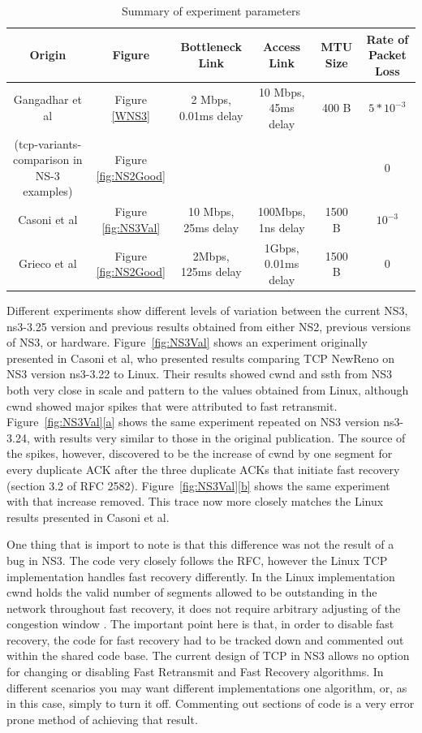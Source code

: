 \documentclass[conference]{IEEEtran}
\begin{document}
\begin{table}[!t]
\renewcommand{\arraystretch}{1.3}
\caption{Summary of experiment parameters} 
\label{table:exps}
\centering
\begin{tabular}{|c||c||c||c||c||c|}
\hline
\textbf{Origin} & \textbf{Figure} & \textbf{Bottleneck Link} & \textbf{Access Link} & \textbf{MTU Size} & \textbf{Rate of Packet Loss}\\ 
\hline
Gangadhar et al\cite{NS3W} & Figure \ref{WNS3} & 2 Mbps, 0.01ms delay & 10 Mbps, 45ms delay & 400 B & $5*10^{-3}$\\
(tcp-variants-comparison in NS-3 examples) & Figure \ref{fig:NS2Good} &  &  &  & 0 \\
\hline
Casoni et al\cite{NS3Val} & Figure \ref{fig:NS3Val} & 10 Mbps, 25ms delay & 100Mbps, 1ns delay & 1500 B & $10^{-3}$\\
\hline
Grieco et al\cite{NS2WP} & Figure \ref{fig:NS2Good} & 2Mbps, 125ms delay & 1Gbps, 0.01ms delay & 1500 B & 0 \\
\hline
\end{tabular}
\end{table}

Different experiments show different levels of variation between the current NS3, ns3-3.25 version and previous results obtained from either NS2, previous versions of NS3, or hardware. Figure~\ref{fig:NS3Val} shows an experiment originally presented in Casoni et al\cite{NS3Val}, who presented results comparing TCP NewReno on NS3 version ns3-3.22 to Linux. Their results showed cwnd and ssth from NS3 both very close in scale and pattern to the values obtained from Linux, although cwnd showed major spikes that were attributed to fast retransmit. Figure~\ref{fig:NS3Val}\ref{a} shows the same experiment repeated on NS3 version ns3-3.24, with results very similar to those in the original publication. The source of the spikes, however, discovered to be the increase of cwnd by one segment for every duplicate ACK after the three duplicate ACKs that initiate fast recovery (section 3.2 of RFC 2582\cite{RFC2582}). Figure~\ref{fig:NS3Val}\ref{b} shows the same experiment with that increase removed. This trace now more closely matches the Linux results presented in Casoni et al\cite{NS3Val}.

One thing that is import to note is that this difference was not the result of a bug in NS3. The code very closely follows the RFC, however the Linux TCP implementation handles fast recovery differently. In the Linux implementation cwnd holds the valid number of segments allowed to be outstanding in the network throughout fast recovery, it does not require arbitrary adjusting of the congestion window \cite{NS3Val} \cite{LinuxTCP}. The important point here is that, in order to disable fast recovery, the code for fast recovery had to be tracked down and commented out within the shared code base. The current design of TCP in NS3 allows no option for changing or disabling Fast Retransmit and Fast Recovery algorithms. In different scenarios you may want different implementations one algorithm, or, as in this case, simply to turn it off. Commenting out sections of code is a very error prone method of achieving that result. 
\end{document}
